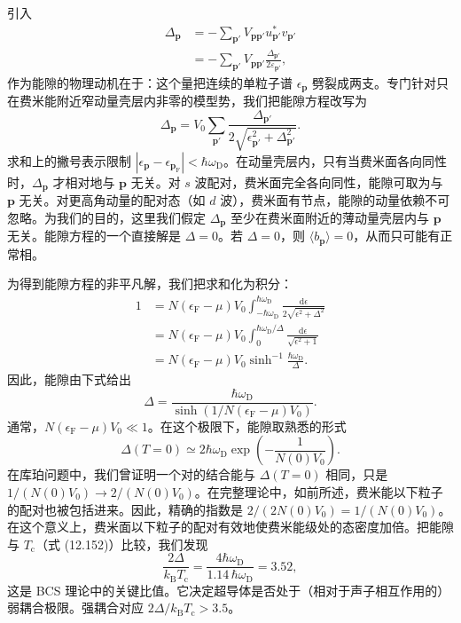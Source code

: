 引入
\begin{align*}
\Delta_{\mathbf p}&=-\sum_{\mathbf p'}V_{\mathbf p\mathbf p'}u^*_{\mathbf p'}v_{\mathbf p'}\\
&=-\sum_{\mathbf p'}V_{\mathbf p\mathbf p'}\frac{\Delta_{\mathbf p'}}{2\varepsilon_{\mathbf p'}}, \tag{12.208}
\end{align*}
作为能隙的物理动机在于：这个量把连续的单粒子谱 $\epsilon_{\mathbf p}$ 劈裂成两支。专门针对只在费米能附近窄动量壳层内非零的模型势，我们把能隙方程改写为
\begin{equation*}
\Delta_{\mathbf p}=V_0{\sum_{\mathbf p'}}\frac{\Delta_{\mathbf p'}}{2\sqrt{\epsilon^2_{\mathbf p'}+\Delta^2_{\mathbf p'}}}. \tag{12.209}
\end{equation*}
求和上的撇号表示限制 $\left|\epsilon_{\mathbf p}-\epsilon_{\mathbf p_{\mathrm F}}\right|<\hbar\omega_{\mathrm D}$。在动量壳层内，只有当费米面各向同性时，$\Delta_{\mathbf p}$ 才相对地与 $\mathbf p$ 无关。对 $s$ 波配对，费米面完全各向同性，能隙可取为与 $\mathbf p$ 无关。对更高角动量的配对态（如 $d$ 波），费米面有节点，能隙的动量依赖不可忽略。为我们的目的，这里我们假定 $\Delta_{\mathbf p}$ 至少在费米面附近的薄动量壳层内与 $\mathbf p$ 无关。能隙方程的一个直接解是 $\Delta=0$。若 $\Delta=0$，则 $\langle b_{\mathbf p}\rangle=0$，从而只可能有正常相。

为得到能隙方程的非平凡解，我们把求和化为积分：
\begin{align*}
1&=N\left(\epsilon_{\mathrm F}-\mu\right)V_0\int_{-\hbar\omega_{\mathrm D}}^{\hbar\omega_{\mathrm D}}\frac{\mathrm d\epsilon}{2\sqrt{\epsilon^2+\Delta^2}}\\
&=N\left(\epsilon_{\mathrm F}-\mu\right)V_0\int_0^{\hbar\omega_{\mathrm D}/\Delta}\frac{\mathrm d\epsilon}{\sqrt{\epsilon^2+1}}\\
&=N\left(\epsilon_{\mathrm F}-\mu\right)V_0\sinh^{-1}\frac{\hbar\omega_{\mathrm D}}{\Delta}. \tag{12.210}
\end{align*}
因此，能隙由下式给出
\begin{equation*}
\Delta=\frac{\hbar\omega_{\mathrm D}}{\sinh\left(1/N\left(\epsilon_{\mathrm F}-\mu\right)V_0\right)}. \tag{12.211}
\end{equation*}
通常，$N\left(\epsilon_{\mathrm F}-\mu\right)V_0\ll 1$。在这个极限下，能隙取熟悉的形式
\begin{equation*}
\Delta(T=0)\simeq 2\hbar\omega_{\mathrm D}\exp\left(-\frac{1}{N(0)V_0}\right). \tag{12.212}
\end{equation*}
在库珀问题中，我们曾证明一个对的结合能与 $\Delta(T=0)$ 相同，只是 $1/\left(N(0)V_0\right)\to 2/\left(N(0)V_0\right)$。在完整理论中，如前所述，费米能以下粒子的配对也被包括进来。因此，精确的指数是 $2/\left(2N(0)V_0\right)=1/\left(N(0)V_0\right)$。在这个意义上，费米面以下粒子的配对有效地使费米能级处的态密度加倍。把能隙与 $T_{\mathrm c}$（式 (12.152)）比较，我们发现
\begin{equation*}
\frac{2\Delta}{k_{\mathrm B}T_{\mathrm c}}=\frac{4\hbar\omega_{\mathrm D}}{1.14\,\hbar\omega_{\mathrm D}}=3.52, \tag{12.213}
\end{equation*}
这是 BCS 理论中的关键比值。它决定超导体是否处于（相对于声子相互作用的）弱耦合极限。强耦合对应 $2\Delta/k_{\mathrm B}T_{\mathrm c}>3.5$。

